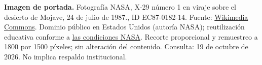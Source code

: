 \noindent\textbf{Imagen de portada.} Fotografía NASA,
X-29 número 1 en viraje sobre el desierto de Mojave, 24 de julio de 1987., ID EC87-0182-14. Fuente: \href{https://commons.wikimedia.org/wiki/File:X-29_in_Banked_Flight.jpg}{Wikimedia Commons}.
Dominio público en Estados Unidos (autoría NASA); reutilización educativa conforme a \href{https://www.nasa.gov/nasa-brand-center/images-and-media/}{las condiciones NASA}. Recorte proporcional y remuestreo a 1800 por 1500 píxeles; sin alteración del contenido. Consulta: 19 de octubre de 2026. No implica respaldo institucional.
